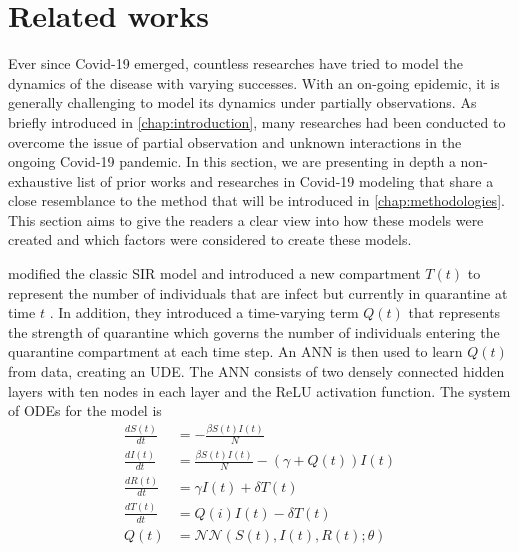 \section{Related works}

Ever since Covid-19 emerged, countless researches have tried to model the dynamics of the disease with varying successes.
With an on-going epidemic, it is generally challenging to model its dynamics under partially observations.
As briefly introduced in \autoref{chap:introduction}, many researches had been conducted to overcome the issue of partial observation and unknown interactions in the ongoing Covid-19 pandemic.
In this section, we are presenting in depth a non-exhaustive list of prior works and researches in Covid-19 modeling that share a close resemblance to the method that will be introduced in \autoref{chap:methodologies}.
This section aims to give the readers a clear view into how these models were created and which factors were considered to create these models.

\citeauthor{dandekarMachineLearningAidedGlobal2020a} modified the classic \gls{SIR} model and introduced a new compartment $T(t)$ to represent the number of individuals that are infect but currently in quarantine at time $t$ \cite{dandekarMachineLearningAidedGlobal2020a}.
In addition, they introduced a time-varying term $Q(t)$ that represents the strength of quarantine which governs the number of individuals entering the quarantine compartment at each time step.
An \gls{ANN} is then used to learn $Q(t)$ from data, creating an \gls{UDE}.
The \gls{ANN} consists of two densely connected hidden layers with ten nodes in each layer and the \gls{ReLU} activation function.
The system of \glspl{ODE} for the model is
\begin{align*}
    \frac{dS(t)}{dt} &= -\frac{\beta S(t) I(t)}{N} \\
    \frac{dI(t)}{dt} &= \frac{\beta S(t) I(t)}{N}  - (\gamma + Q(t)) I(t) \\
    \frac{dR(t)}{dt} &= \gamma I(t) + \delta T(t) \\
    \frac{dT(t)}{dt} &= Q(i)I(t) - \delta T(t) \\
    Q(t) &= \mathcal{NN}(S(t),I(t),R(t); \theta)
\end{align*}
